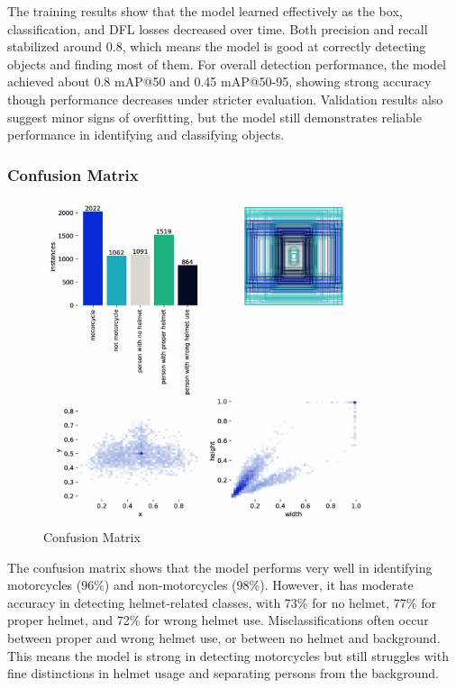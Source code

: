 \begin{refsection}
\noindent
The training results show that the model learned effectively as the box, classification, and DFL losses decreased over time. Both precision and recall stabilized around 0.8, which means the model is good at correctly detecting objects and finding most of them. For overall detection performance, the model achieved about 0.8 mAP@50 and 0.45 mAP@50-95, showing strong accuracy though performance decreases under stricter evaluation. Validation results also suggest minor signs of overfitting, but the model still demonstrates reliable performance in identifying and classifying objects.

\subsubsection{Confusion Matrix}
\begin{figure}[ht]
    \centering
	\includegraphics[width=0.85\textwidth]{figures/Fig 16.jpg}
	\caption[Confusion Matrix]{Confusion Matrix}
	\label{fig:confusion_matrix}
\end{figure}

\noindent
The confusion matrix shows that the model performs very well in identifying motorcycles (96\%) and non-motorcycles (98\%). However, it has moderate accuracy in detecting helmet-related classes, with 73\% for no helmet, 77\% for proper helmet, and 72\% for wrong helmet use. Misclassifications often occur between proper and wrong helmet use, or between no helmet and background. This means the model is strong in detecting motorcycles but still struggles with fine distinctions in helmet usage and separating persons from the background.


\end{refsection}
